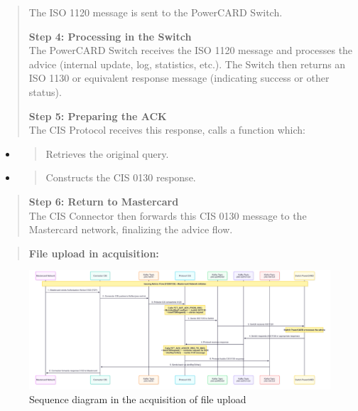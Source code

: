 \documentclass[12pt,a4paper]{report}
\begin{document}
\begin{quote}
The ISO 1120 message is sent to the PowerCARD Switch.

\textbf{Step 4: Processing in the Switch}\\
The PowerCARD Switch receives the ISO 1120 message and processes the
advice (internal update, log, statistics, etc.). The Switch then returns
an ISO 1130 or equivalent response message (indicating success or other
status).

\textbf{Step 5: Preparing the ACK}\\
The CIS Protocol receives this response, calls a function which:
\end{quote}

\begin{itemize}
\item
  \begin{quote}
  Retrieves the original query.
  \end{quote}
\item
  \begin{quote}
  Constructs the CIS 0130 response.
  \end{quote}
\end{itemize}

\begin{quote}
\textbf{Step 6: Return to Mastercard}\\
The CIS Connector then forwards this CIS 0130 message to the Mastercard
network, finalizing the advice flow.
\end{quote}

\begin{quote}
\textbf{File upload in acquisition:}
\end{quote}

\begin{figure}[H]
\centering
\includegraphics[width=\textwidth,height=1\textheight,keepaspectratio]{media/image43.png}
\caption{Sequence diagram in the acquisition of file upload}
\label{fig:FUSD}
\end{figure}
\end{document}
